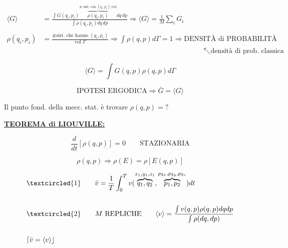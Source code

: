 \documentclass[12pt,a4paper]{article}
\begin{document}
\vspace{0.3cm}
\begin{align*}
    \langle G \rangle &= \frac{ \int G(q_i, p_i) \overbrace{\rho(q_i, p_i)}^{\# \text{ sist. con } (q_i, p_i)/\text{vol}} dq \, dp }{ \int \rho(q_i, p_i) dq \, dp } \Rightarrow \langle G \rangle = \frac{1}{M} \sum_i G_i \\
    \\
    \rho(q_i, p_i) &= \frac{\# \text{sist. che hanno } (q_i, p_i)}{\text{vol } \Gamma} \Rightarrow \int \rho(q, p) d\Gamma = 1 \Rightarrow \text{DENSITÀ di PROBABILITÀ} \\
    & \qquad\qquad\qquad\qquad\qquad\qquad\qquad\qquad\qquad\qquad\qquad\quad \nwarrow \text{densità di prob. classica}
\end{align*}

\vspace{0.3cm}
\begin{equation*}
    \langle G \rangle = \int G(q, p) \rho(q, p) d\Gamma
\end{equation*}

\vspace{0.5cm}
\begin{equation*}
    \text{IPOTESI ERGODICA} \Rightarrow \boxed{ \bar{G} = \langle G \rangle }
\end{equation*}

\vspace{0.8cm}
\noindent Il punto fond. della mecc. stat. è trovare $\rho(q, p) = ?$

\vspace{0.8cm}
\noindent \underline{\textbf{TEOREMA di LIOUVILLE:}}

\begin{equation*}
    \boxed{ \frac{d}{dt}[\rho(q, p)] = 0 } \qquad \text{STAZIONARIA}
\end{equation*}

\begin{equation*}
    \rho(q, p) \Rightarrow \rho(E) = \rho[E(q, p)]
\end{equation*}

\vspace{0.5cm}


\begin{align*}
    & \textcircled{1} \qquad \bar{v} = \frac{1}{T} \int_0^T v(\overbrace{q_1, q_2}^{x_1, y_1, z_1}, \overbrace{p_1, p_2}^{p_{2x}, p_{2y}, p_{2z}}) dt \\
    \\
    & \textcircled{2} \qquad M \text{ REPLICHE} \qquad \langle v \rangle = \frac{ \int v(q, p) \rho(q, p) dq dp }{ \int \rho(dq, dp) } \\
    \\
    & \lceil \bar{v} = \langle v \rangle \rfloor
\end{align*}
\end{document}

